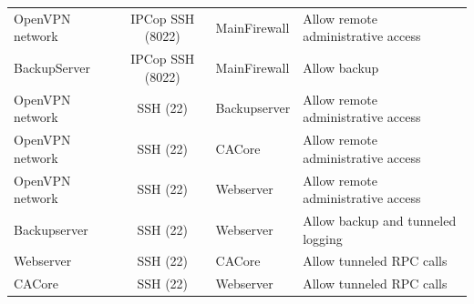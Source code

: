 \documentclass[a4paper, toc=index, 12pt, DIV14, twoside, BCOR2cm, headsepline, numbers=noenddot, bibliography=totoc]{report}
\begin{document}
\begin{description}
\begin{tabular}{p{2.5cm} c l p{4cm}}
\cline{1-4}
OpenVPN network & IPCop SSH (8022) & MainFirewall & Allow remote administrative access\\
\cline{1-4}
BackupServer & IPCop SSH (8022) & MainFirewall & Allow backup\\
\cline{1-4}
OpenVPN network & SSH (22) & Backupserver & Allow remote administrative access \\
\cline{1-4}
OpenVPN network & SSH (22) & CACore & Allow remote administrative access \\
\cline{1-4}
OpenVPN network & SSH (22) & Webserver & Allow remote administrative access \\
\cline{1-4}
Backupserver & SSH (22) & Webserver & Allow backup and tunneled logging\\
\cline{1-4}
Webserver & SSH (22) & CACore & Allow tunneled RPC calls\\
\cline{1-4}
CACore & SSH (22) & Webserver & Allow tunneled RPC calls \\
\end{tabular}


\end{description}
\end{document}
